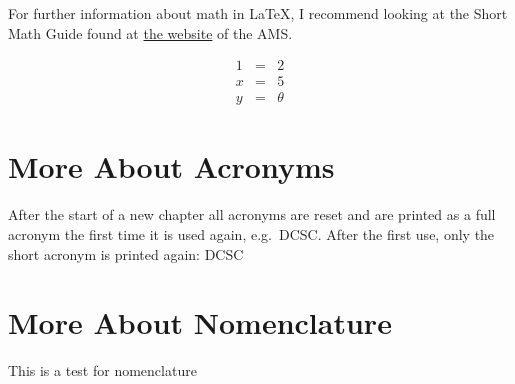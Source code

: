 For further information about math in \LaTeX, I recommend looking at the Short Math Guide found at \href{http://www.ams.org/tex/amslatex.html}{the website} of the \ac{AMS}. 

\begin{eqnarray}
  1 &=& 2\\
  x &=& 5 \\
  y &=& \theta
\end{eqnarray}


\section{More About Acronyms}

After the start of a new chapter all acronyms are reset and are printed as a full acronym the first time it is used again, e.g.\ \ac{DCSC}. After the first use, only the short acronym is printed again: \ac{DCSC}


\section{More About Nomenclature}

This is a test for nomenclature 
